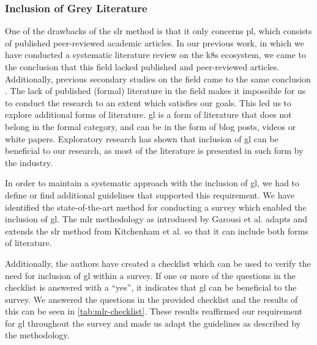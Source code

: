 \subsubsection{Inclusion of Grey Literature}
\label{sec:survey:methodology:strategy:gl}

One of the drawbacks of the \gls{slr} method is that it only concerns \gls{pl}, which consists of published peer-reviewed academic articles. In our previous work, in which we have conducted a systematic literature review on the \gls{k8s} ecosystem, we came to the conclusion that this field lacked published and peer-reviewed articles. Additionally, previous secondary studies on the field came to the same conclusion \cite{service-mesh-survey}. The lack of published (formal) literature in the field makes it impossible for us to conduct the research to an extent which satisfies our goals. This led us to explore additional forms of literature. \Gls{gl} is a form of literature that does not belong in the formal category, and can be in the form of blog posts, videos or white papers. Exploratory research has shown that inclusion of \gls{gl} can be beneficial to our research, as most of the literature is presented in such form by the industry.

In order to maintain a systematic approach with the inclusion of \gls{gl}, we had to define or find additional guidelines that supported this requirement. We have identified the state-of-the-art method for conducting a survey which enabled the inclusion of \gls{gl}. The \gls{mlr} methodology as introduced by Garousi et al. \cite{Garousi2019} adapts and extends the \gls{slr} method from Kitchenham et al. so that it can include both forms of literature. 



Additionally, the authors have created a checklist which can be used to verify the need for inclusion of \gls{gl} within a survey. If one or more of the questions in the checklist is answered with a “yes”, it indicates that \gls{gl} can be beneficial to the survey. We answered the questions in the provided checklist and the results of this can be seen in \cref{tab:mlr-checklist}. These results reaffirmed our requirement for \gls{gl} throughout the survey and made us adapt the guidelines as described by the methodology.




